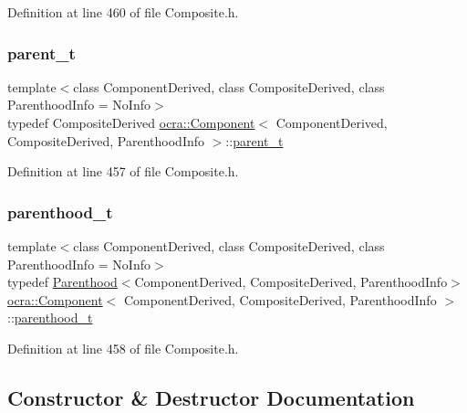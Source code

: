 Definition at line 460 of file Composite.\+h.

\hypertarget{classocra_1_1Component_a2111c5ff33bd22310754dfd54c9e2a34}{}\label{classocra_1_1Component_a2111c5ff33bd22310754dfd54c9e2a34} 
\subsubsection{\texorpdfstring{parent\+\_\+t}{parent\_t}}
{\footnotesize\ttfamily template$<$class Component\+Derived, class Composite\+Derived, class Parenthood\+Info = No\+Info$>$ \\
typedef Composite\+Derived \hyperlink{classocra_1_1Component}{ocra\+::\+Component}$<$ Component\+Derived, Composite\+Derived, Parenthood\+Info $>$\+::\hyperlink{classocra_1_1Component_a2111c5ff33bd22310754dfd54c9e2a34}{parent\+\_\+t}}



Definition at line 457 of file Composite.\+h.

\hypertarget{classocra_1_1Component_a70fb7cda78934a9f017c7e46c1407953}{}\label{classocra_1_1Component_a70fb7cda78934a9f017c7e46c1407953} 
\subsubsection{\texorpdfstring{parenthood\+\_\+t}{parenthood\_t}}
{\footnotesize\ttfamily template$<$class Component\+Derived, class Composite\+Derived, class Parenthood\+Info = No\+Info$>$ \\
typedef \hyperlink{classocra_1_1Parenthood}{Parenthood}$<$Component\+Derived, Composite\+Derived, Parenthood\+Info$>$ \hyperlink{classocra_1_1Component}{ocra\+::\+Component}$<$ Component\+Derived, Composite\+Derived, Parenthood\+Info $>$\+::\hyperlink{classocra_1_1Component_a70fb7cda78934a9f017c7e46c1407953}{parenthood\+\_\+t}}



Definition at line 458 of file Composite.\+h.



\subsection{Constructor \& Destructor Documentation}
\hypertarget{classocra_1_1Component_a4c76a9060703e7f524c73f6b328bb3e1}{}\label{classocra_1_1Component_a4c76a9060703e7f524c73f6b328bb3e1} 
